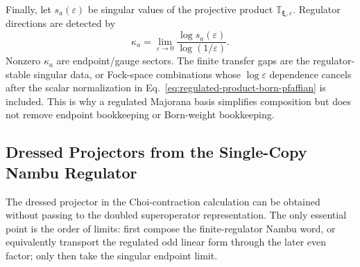 \documentclass[aps,prb,onecolumn,nofootinbib,superscriptaddress]{revtex4-2}
\newcommand{\bxi}{{\boldsymbol{\xi}}}
\theoremstyle{plain}
\theoremstyle{definition}
\begin{document}
Finally, let \(s_a(\varepsilon)\) be singular values of the projective product
\(\mathbb T_{\bxi,\varepsilon}\).  Regulator directions are detected by
\begin{equation}
  \kappa_a=
  \lim_{\varepsilon\to0}
  \frac{\log s_a(\varepsilon)}{\log(1/\varepsilon)} .
  \label{eq:regulator-slope-kappa}
\end{equation}
Nonzero \(\kappa_a\) are endpoint/gauge sectors.  The finite transfer gaps
are the regulator-stable singular data, or Fock-space combinations whose
\(\log\varepsilon\) dependence cancels after the scalar normalization in
Eq.~\eqref{eq:regulated-product-born-pfaffian} is included.  This is why a
regulated Majorana basis simplifies composition but does not remove endpoint
bookkeeping or Born-weight bookkeeping.

\subsection{Dressed Projectors from the Single-Copy Nambu Regulator}
\label{sec:nambu-regulator-dressed-projector}

The dressed projector in the Choi-contraction calculation can be obtained
without passing to the doubled superoperator representation.  The only
essential point is the order of limits: first compose the finite-regulator
Nambu word, or equivalently transport the regulated odd linear form through
the later even factor; only then take the singular endpoint limit.
\end{document}
